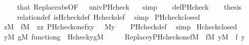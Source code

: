 \begin{isabellebody}
\ \ \ \ \isamarkupfalse%
\ that\ Replace{\isacharunderscore}{\kern0pt}abs{\isacharbrackleft}{\kern0pt}OF\ {\isacharunderscore}{\kern0pt}\ {\isacharunderscore}{\kern0pt}\ univ{\isacharunderscore}{\kern0pt}PHcheck\ {}{\isacharbrackright}{\kern0pt}\ \isamarkupfalse%
\ simp\isanewline
\ \ \isamarkupfalse%
\ def{\isacharunderscore}{\kern0pt}PHcheck\isanewline
\ \ \isamarkupfalse%
\ {\isacharquery}{\kern0pt}thesis\isanewline
\ \ \ \ \isamarkupfalse%
\ relation{}{\isacharunderscore}{\kern0pt}def\ is{\isacharunderscore}{\kern0pt}Hcheck{\isacharunderscore}{\kern0pt}def\ Hcheck{\isacharunderscore}{\kern0pt}def\ \isamarkupfalse%
\ simp\isanewline
{}\isamarkupfalse%
%
\endisatagproof
{\isafoldproof}%
%
\isadelimproof
\isanewline
%
\endisadelimproof
\isanewline
{}\isamarkupfalse%
\ PHcheck{\isacharunderscore}{\kern0pt}closed\ {\isacharcolon}{\kern0pt}\isanewline
\ \ {\isachardoublequoteopen}{\isasymlbrakk}z{\isasymin}M\ {\isacharsemicolon}{\kern0pt}\ f{\isasymin}M\ {\isacharsemicolon}{\kern0pt}\ x{\isasymin}z{\isacharsemicolon}{\kern0pt}\ PHcheck{\isacharparenleft}{\kern0pt}one{\isacharcomma}{\kern0pt}f{\isacharcomma}{\kern0pt}x{\isacharcomma}{\kern0pt}y{\isacharparenright}{\kern0pt}\ {\isasymrbrakk}\ {\isasymLongrightarrow}\ {\isacharparenleft}{\kern0pt}{\isacharhash}{\kern0pt}{\isacharhash}{\kern0pt}M{\isacharparenright}{\kern0pt}{\isacharparenleft}{\kern0pt}y{\isacharparenright}{\kern0pt}{\isachardoublequoteclose}\isanewline
%
\isadelimproof
\ \ %
\endisadelimproof
%
\isatagproof
{}\isamarkupfalse%
\ PHcheck{\isacharunderscore}{\kern0pt}def\ \isamarkupfalse%
\ simp%
\endisatagproof
{\isafoldproof}%
%
\isadelimproof
\isanewline
%
\endisadelimproof
\isanewline
{}\isamarkupfalse%
\ Hcheck{\isacharunderscore}{\kern0pt}closed\ {\isacharcolon}{\kern0pt}\isanewline
\ \ {\isachardoublequoteopen}{\isasymforall}y{\isasymin}M{\isachardot}{\kern0pt}\ {\isasymforall}g{\isasymin}M{\isachardot}{\kern0pt}\ function{\isacharparenleft}{\kern0pt}g{\isacharparenright}{\kern0pt}\ {\isasymlongrightarrow}\ Hcheck{\isacharparenleft}{\kern0pt}y{\isacharcomma}{\kern0pt}g{\isacharparenright}{\kern0pt}{\isasymin}M{\isachardoublequoteclose}\isanewline
%
\isadelimproof
%
\endisadelimproof
%
\isatagproof
{}\isamarkupfalse%
\ {\isacharminus}{\kern0pt}\isanewline
\ \ \isamarkupfalse%
\ {\isachardoublequoteopen}Replace{\isacharparenleft}{\kern0pt}y{\isacharcomma}{\kern0pt}PHcheck{\isacharparenleft}{\kern0pt}one{\isacharcomma}{\kern0pt}f{\isacharparenright}{\kern0pt}{\isacharparenright}{\kern0pt}{\isasymin}M{\isachardoublequoteclose}\ \ {\isachardoublequoteopen}f{\isasymin}M{\isachardoublequoteclose}\ {\isachardoublequoteopen}y{\isasymin}M{\isachardoublequoteclose}\ \ f\ y\isanewline

\end{isabellebody}
